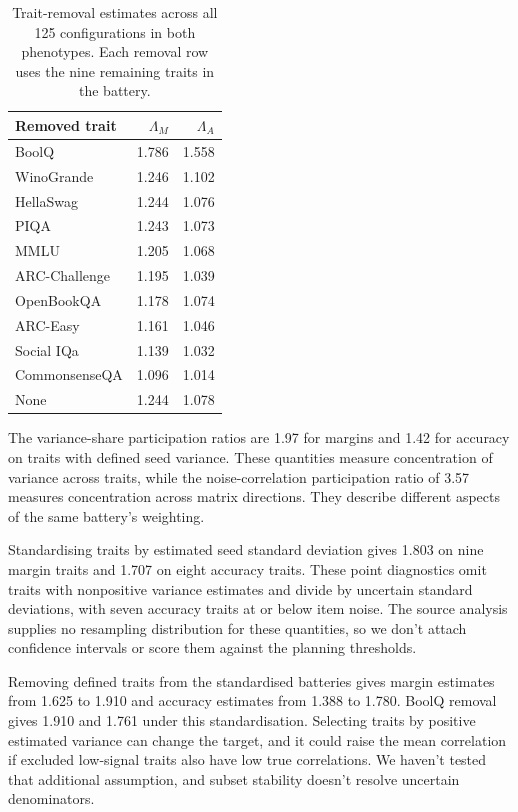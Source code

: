 \begin{table}[htbp]
\centering\small
\caption{Trait-removal estimates across all 125 configurations in both phenotypes. Each removal row uses the nine remaining traits in the battery.}
\label{tab:original10}
\begin{tabular}{lrr}\hline
Removed trait & $\Lambda_M$ & $\Lambda_A$\\\hline
BoolQ & 1.786 & 1.558\\
WinoGrande & 1.246 & 1.102\\
HellaSwag & 1.244 & 1.076\\
PIQA & 1.243 & 1.073\\
MMLU & 1.205 & 1.068\\
ARC-Challenge & 1.195 & 1.039\\
OpenBookQA & 1.178 & 1.074\\
ARC-Easy & 1.161 & 1.046\\
Social IQa & 1.139 & 1.032\\
CommonsenseQA & 1.096 & 1.014\\
None & 1.244 & 1.078\\\hline
\end{tabular}
\end{table}

The variance-share participation ratios are 1.97 for margins and 1.42 for accuracy on traits with defined seed variance. These quantities measure concentration of variance across traits, while the noise-correlation participation ratio of 3.57 measures concentration across matrix directions. They describe different aspects of the same battery's weighting.

Standardising traits by estimated seed standard deviation gives 1.803 on nine margin traits and 1.707 on eight accuracy traits. These point diagnostics omit traits with nonpositive variance estimates and divide by uncertain standard deviations, with seven accuracy traits at or below item noise. The source analysis supplies no resampling distribution for these quantities, so we don't attach confidence intervals or score them against the planning thresholds.

Removing defined traits from the standardised batteries gives margin estimates from 1.625 to 1.910 and accuracy estimates from 1.388 to 1.780. BoolQ removal gives 1.910 and 1.761 under this standardisation. Selecting traits by positive estimated variance can change the target, and it could raise the mean correlation if excluded low-signal traits also have low true correlations. We haven't tested that additional assumption, and subset stability doesn't resolve uncertain denominators.

